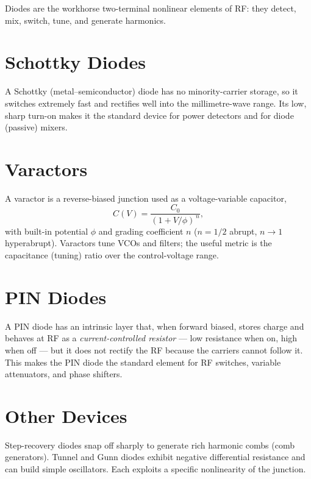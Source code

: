 Diodes are the workhorse two-terminal nonlinear elements of RF: they detect,
mix, switch, tune, and generate harmonics.

\section{Schottky Diodes}
A Schottky (metal--semiconductor) diode has no minority-carrier storage, so it
switches extremely fast and rectifies well into the millimetre-wave range. Its
low, sharp turn-on makes it the standard device for power detectors and for
diode (passive) mixers.

\section{Varactors}
A varactor is a reverse-biased junction used as a voltage-variable capacitor,
\[ C(V) = \frac{C_0}{(1 + V/\phi)^{\,n}}, \]
with built-in potential $\phi$ and grading coefficient $n$ ($n=1/2$ abrupt,
$n\!\to\!1$ hyperabrupt). Varactors tune VCOs and filters; the useful metric is the
capacitance (tuning) ratio over the control-voltage range.

\section{PIN Diodes}
A PIN diode has an intrinsic layer that, when forward biased, stores charge and
behaves at RF as a \emph{current-controlled resistor} --- low resistance when on,
high when off --- but it does not rectify the RF because the carriers cannot
follow it. This makes the PIN diode the standard element for RF switches,
variable attenuators, and phase shifters.

\section{Other Devices}
Step-recovery diodes snap off sharply to generate rich harmonic combs (comb
generators). Tunnel and Gunn diodes exhibit negative differential resistance and
can build simple oscillators. Each exploits a specific nonlinearity of the
junction.
